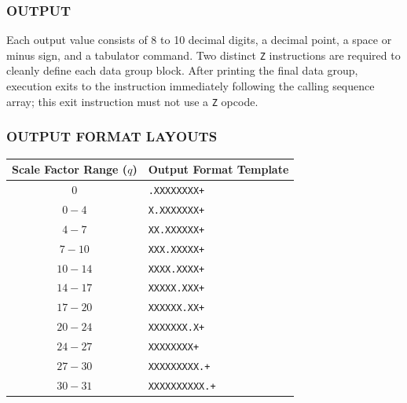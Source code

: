 \subsubsection*{OUTPUT}
Each output value consists of 8 to 10 decimal digits, a decimal point, a space or minus sign, and a tabulator command. Two distinct \texttt{Z} instructions are required to cleanly define each data group block. After printing the final data group, execution exits to the instruction immediately following the calling sequence array; this exit instruction must not use a \texttt{Z} opcode.

\subsubsection*{OUTPUT FORMAT LAYOUTS}
\begin{center}
\begin{tabular}{cl}
    \toprule
    \textbf{Scale Factor Range ($q$)} & \textbf{Output Format Template} \\
    \midrule
    $0$                               & \texttt{.XXXXXXXX+}     \\
    $0 - 4$                           & \texttt{X.XXXXXXX+}     \\
    $4 - 7$                           & \texttt{XX.XXXXXX+}     \\
    $7 - 10$                          & \texttt{XXX.XXXXX+}     \\
    $10 - 14$                         & \texttt{XXXX.XXXX+}     \\
    $14 - 17$                         & \texttt{XXXXX.XXX+}     \\
    $17 - 20$                         & \texttt{XXXXXX.XX+}     \\
    $20 - 24$                         & \texttt{XXXXXXX.X+}     \\
    $24 - 27$                         & \texttt{XXXXXXXX+}      \\
    $27 - 30$                         & \texttt{XXXXXXXXX.+}    \\
    $30 - 31$                         & \texttt{XXXXXXXXXX.+}   \\
    \bottomrule
\end{tabular}
\end{center}

